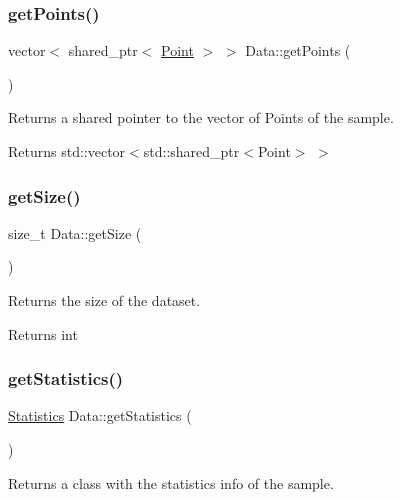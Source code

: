 \subsubsection{\texorpdfstring{get\+Points()}{getPoints()}}
{\footnotesize\ttfamily vector$<$ shared\+\_\+ptr$<$ \hyperlink{class_point}{Point} $>$ $>$ Data\+::get\+Points (\begin{DoxyParamCaption}{ }\end{DoxyParamCaption})}



Returns a shared pointer to the vector of Points of the sample. 

\begin{DoxyReturn}{Returns}
std\+::vector$<$std\+::shared\+\_\+ptr$<$\+Point$>$ $>$ 
\end{DoxyReturn}
\mbox{\label{class_data_a269f9d89ef47b9cf30454cd88c8ccf65}} 
\subsubsection{\texorpdfstring{get\+Size()}{getSize()}}
{\footnotesize\ttfamily size\+\_\+t Data\+::get\+Size (\begin{DoxyParamCaption}{ }\end{DoxyParamCaption})\hspace{0.3cm}{\ttfamily [inline]}}



Returns the size of the dataset. 

\begin{DoxyReturn}{Returns}
int 
\end{DoxyReturn}
\mbox{\label{class_data_a26376768a100f1999ef3ac15a2aa2a67}} 
\subsubsection{\texorpdfstring{get\+Statistics()}{getStatistics()}}
{\footnotesize\ttfamily \hyperlink{class_statistics}{Statistics} Data\+::get\+Statistics (\begin{DoxyParamCaption}{ }\end{DoxyParamCaption})}



Returns a class with the statistics info of the sample. 

